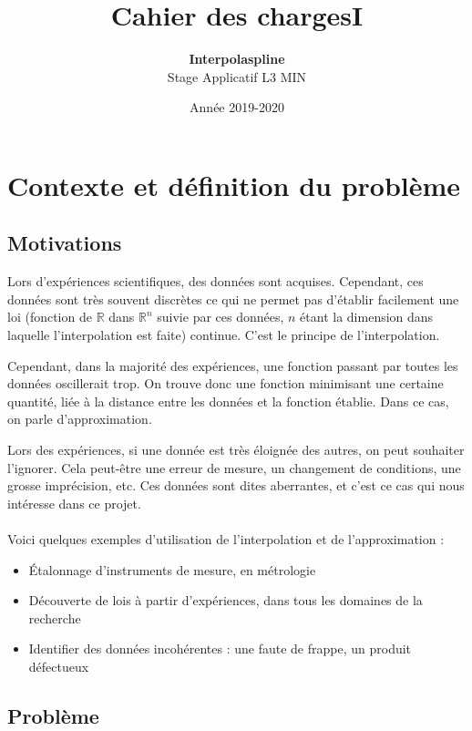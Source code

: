 \documentclass[a4paper,12pt]{article}
\title{Cahier des chargesI}
\author{\textbf{Interpolaspline}\\Stage Applicatif L3 MIN}
\date{Année 2019-2020}
\newcommand{\IKex}[2]{\mathbb{#1}^{#2}}
\newcommand{\IK}[1]{\mathbb{#1}}
\newcommand{\IRex}[1]{\IKex{R}{#1}}
\newcommand{\IR}{\IK{R}}
\begin{document}
\maketitle
\tableofcontents

\newpage

\section{Contexte et définition du problème}

\subsection{Motivations}

Lors d'expériences scientifiques, des données sont acquises. Cependant, ces données sont très souvent discrètes ce qui ne permet pas d'établir facilement une loi (fonction de $\IR$ dans $\IRex{n}$ suivie par ces données, $n$ étant la dimension dans laquelle l'interpolation est faite) continue. C'est le principe de l'interpolation.

Cependant, dans la majorité des expériences, une fonction passant par toutes les données oscillerait trop. On trouve donc une fonction minimisant une certaine quantité, liée à la distance entre les données et la fonction établie. Dans ce cas, on parle d'approximation.

Lors des expériences, si une donnée est très éloignée des autres, on peut souhaiter l'ignorer. Cela peut-être une erreur de mesure, un changement de conditions, une grosse imprécision, etc. Ces données sont dites aberrantes, et c'est ce cas qui nous intéresse dans ce projet.
\\ \\
Voici quelques exemples d'utilisation de l'interpolation et de l'approximation :
\begin{itemize}
\item Étalonnage d'instruments de mesure, en métrologie
\item Découverte de lois à partir d'expériences, dans tous les domaines de la recherche
\item Identifier des données incohérentes : une faute de frappe, un produit défectueux
\end{itemize}

\newpage
\subsection{Problème}
\end{document}
